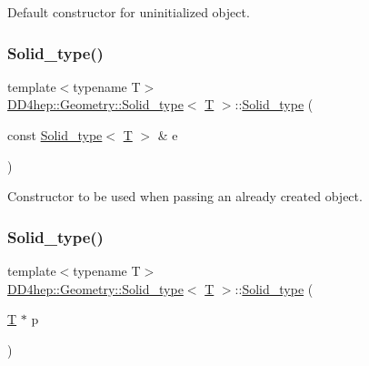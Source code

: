 Default constructor for uninitialized object. 

\hypertarget{class_d_d4hep_1_1_geometry_1_1_solid__type_a94dd4d06930486a7f2a698299decaf24}{}\label{class_d_d4hep_1_1_geometry_1_1_solid__type_a94dd4d06930486a7f2a698299decaf24} 
\subsubsection{\texorpdfstring{Solid\+\_\+type()}{Solid\_type()}\hspace{0.1cm}{\footnotesize\ttfamily [2/5]}}
{\footnotesize\ttfamily template$<$typename T$>$ \\
\hyperlink{class_d_d4hep_1_1_geometry_1_1_solid__type}{D\+D4hep\+::\+Geometry\+::\+Solid\+\_\+type}$<$ \hyperlink{class_t}{T} $>$\+::\hyperlink{class_d_d4hep_1_1_geometry_1_1_solid__type}{Solid\+\_\+type} (\begin{DoxyParamCaption}\item[{const \hyperlink{class_d_d4hep_1_1_geometry_1_1_solid__type}{Solid\+\_\+type}$<$ \hyperlink{class_t}{T} $>$ \&}]{e }\end{DoxyParamCaption})\hspace{0.3cm}{\ttfamily [default]}}



Constructor to be used when passing an already created object. 

\hypertarget{class_d_d4hep_1_1_geometry_1_1_solid__type_a2788d7317836c7fa98581c4b78d871a7}{}\label{class_d_d4hep_1_1_geometry_1_1_solid__type_a2788d7317836c7fa98581c4b78d871a7} 
\subsubsection{\texorpdfstring{Solid\+\_\+type()}{Solid\_type()}\hspace{0.1cm}{\footnotesize\ttfamily [3/5]}}
{\footnotesize\ttfamily template$<$typename T$>$ \\
\hyperlink{class_d_d4hep_1_1_geometry_1_1_solid__type}{D\+D4hep\+::\+Geometry\+::\+Solid\+\_\+type}$<$ \hyperlink{class_t}{T} $>$\+::\hyperlink{class_d_d4hep_1_1_geometry_1_1_solid__type}{Solid\+\_\+type} (\begin{DoxyParamCaption}\item[{\hyperlink{class_t}{T} $\ast$}]{p }\end{DoxyParamCaption})\hspace{0.3cm}{\ttfamily [inline]}}



